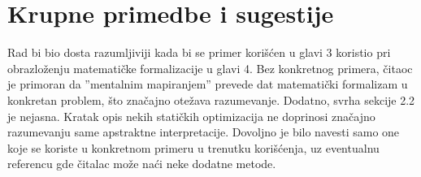 \documentclass[a4paper]{report}
\begin{document}
\section{Krupne primedbe i sugestije}
Rad bi bio dosta razumljiviji kada bi se primer korišćen u glavi 3 koristio pri obrazloženju matematičke formalizacije u glavi 4. Bez konkretnog primera,
čitaoc je primoran da ''mentalnim mapiranjem''  prevede dat matematički formalizam u konkretan problem, što značajno otežava razumevanje.
Dodatno, svrha sekcije 2.2 je nejasna. Kratak opis nekih statičkih optimizacija ne doprinosi značajno razumevanju same apstraktne interpretacije. 
Dovoljno je bilo navesti samo one koje se koriste u konkretnom primeru u trenutku korišćenja, uz eventualnu referencu gde čitalac može naći neke dodatne metode. 
\end{document}
